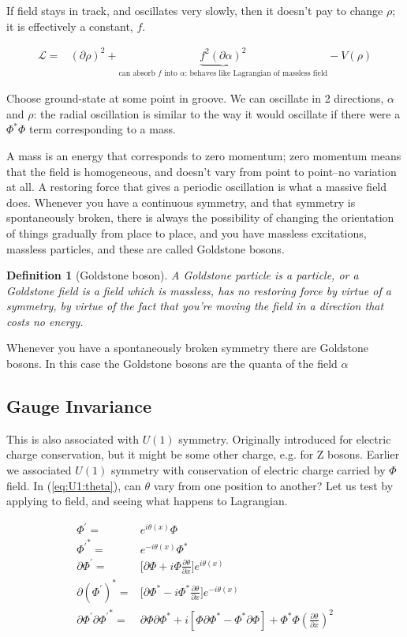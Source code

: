 \documentclass[]{article}
\newtheorem{defn}[thm]{Definition}
\begin{document}
If field stays in track, and oscillates very slowly, then it doesn't pay to change $\rho$; it is effectively a constant, $f$.

\begin{align*}
	\mathcal{L} =& (\partial \rho)^2 + \underbrace{f^2(\partial \alpha)^2}_\text{can absorb $f$ into $\alpha$: behaves like Lagrangian of massless field}   - V(\rho)
\end{align*}

Choose ground-state at some point in groove. We can oscillate in 2 directions, $\alpha$ and $\rho$: the radial oscillation is similar to the way it would oscillate if there were a $\Phi^*\Phi$ term corresponding to a mass.

A mass is an energy that corresponds to zero momentum; zero momentum means that the field is homogeneous, and doesn't vary from point to point--no variation at all. A restoring force that gives a periodic oscillation is what a massive field does. Whenever you have a continuous symmetry, and that symmetry is spontaneously broken, there is always the possibility of changing the orientation of things gradually from place to place, and you have massless excitations, massless particles, and these are called Goldstone bosons.
\begin{defn}[Goldstone boson]
	 A Goldstone particle is a particle, or a Goldstone field is a field which is massless, has no restoring force by virtue of a symmetry, by virtue of the fact that you're moving the field in a direction that costs no energy.
\end{defn}
 Whenever you have a spontaneously broken symmetry there are Goldstone bosons. In this case the Goldstone bosons are the quanta of the field $\alpha$

\subsection{Gauge Invariance}\label{section:gauge:invariance}

This is also associated with $U(1)$ symmetry. Originally introduced for electric charge conservation, but it might be some other charge, e.g. for Z bosons. Earlier we associated $U(1)$ symmetry with conservation of electric charge carried by $\Phi$ field. In (\ref{eq:U1:theta}), can $\theta$ vary from one position to another? Let us test by applying to field, and seeing what happens to Lagrangian.

\begin{align*}
	\Phi^\prime =& e^{i \theta(x)} \Phi \\
	{\Phi^\prime}^* =& e^{-i \theta(x)} \Phi^*\\
	\partial \Phi^\prime =& \big[\partial \Phi + i \Phi \frac{\partial \theta}{\partial x}\big] e^{i \theta(x)}\\
	\partial (\Phi^\prime)^* =& \big[\partial \Phi^* - i \Phi^* \frac{\partial \theta}{\partial x}\big] e^{-i \theta(x)}\\
	\partial \Phi^\prime \partial {\Phi^\prime}^* =&\partial \Phi \partial \Phi^* + i[\Phi \partial \Phi^* -\Phi^* \partial \Phi] + \Phi^* \Phi (\frac{\partial \theta}{\partial x})^2
\end{align*}
\end{document}
